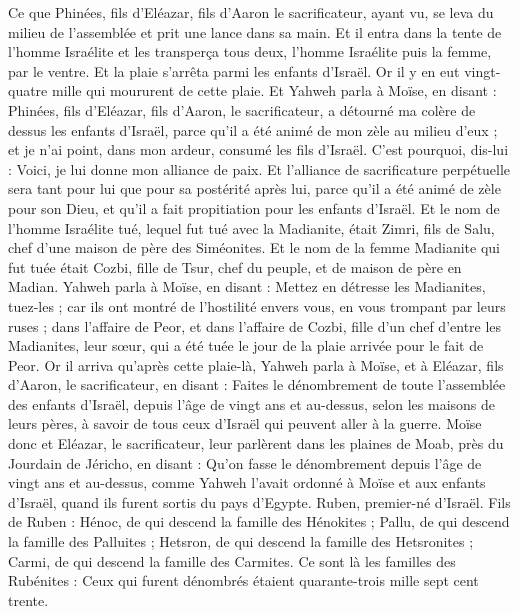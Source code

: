 \begin{multicols}{2}
Ce que Phinées, fils d'Eléazar, fils d'Aaron le sacrificateur, ayant vu, se leva du milieu de l'assemblée et prit une lance dans sa main.
Et il entra dans la tente de l'homme Israélite et les transperça tous deux, l'homme Israélite puis la femme, par le ventre. Et la plaie s'arrêta parmi les enfants d'Israël.
Or il y en eut vingt-quatre mille qui moururent de cette plaie.
Et Yahweh parla à Moïse, en disant :
Phinées, fils d'Eléazar, fils d'Aaron, le sacrificateur, a détourné ma colère de dessus les enfants d'Israël, parce qu'il a été animé de mon zèle au milieu d'eux ; et je n'ai point, dans mon ardeur, consumé les fils d'Israël.
C’est pourquoi, dis-lui : Voici, je lui donne mon alliance de paix.
Et l'alliance de sacrificature perpétuelle sera tant pour lui que pour sa postérité après lui, parce qu'il a été animé de zèle pour son Dieu, et qu'il a fait propitiation pour les enfants d'Israël.
Et le nom de l'homme Israélite tué, lequel fut tué avec la Madianite, était Zimri, fils de Salu, chef d'une maison de père des Siméonites.
Et le nom de la femme Madianite qui fut tuée était Cozbi, fille de Tsur, chef du peuple, et de maison de père en Madian.
Yahweh parla à Moïse, en disant :
Mettez en détresse les Madianites, tuez-les ;
car ils ont montré de l’hostilité envers vous, en vous trompant par leurs ruses ; dans l'affaire de Peor, et dans l'affaire de Cozbi, fille d'un chef d'entre les Madianites, leur sœur, qui a été tuée le jour de la plaie arrivée pour le fait de Peor.
\VerseOne{} Or il arriva qu'après cette plaie-là, Yahweh parla à Moïse, et à Eléazar, fils d'Aaron, le sacrificateur, en disant :
Faites le dénombrement de toute l'assemblée des enfants d'Israël, depuis l'âge de vingt ans et au-dessus, selon les maisons de leurs pères, à savoir de tous ceux d'Israël qui peuvent aller à la guerre.
Moïse donc et Eléazar, le sacrificateur, leur parlèrent dans les plaines de Moab, près du Jourdain de Jéricho, en disant :
Qu’on fasse le dénombrement depuis l'âge de vingt ans et au-dessus, comme Yahweh l'avait ordonné à Moïse et aux enfants d'Israël, quand ils furent sortis du pays d'Egypte.
Ruben, premier-né d'Israël. Fils de Ruben : Hénoc, de qui descend la famille des Hénokites ; Pallu, de qui descend la famille des Palluites ;
Hetsron, de qui descend la famille des Hetsronites ; Carmi, de qui descend la famille des Carmites.
Ce sont là les familles des Rubénites : Ceux qui furent dénombrés étaient quarante-trois mille sept cent trente.

\end{multicols}
